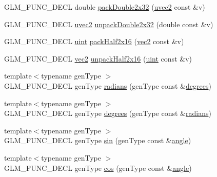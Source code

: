 \begin{DoxyCompactItemize}
\item 
G\+L\+M\+\_\+\+F\+U\+N\+C\+\_\+\+D\+E\+CL double \hyperlink{group__core__func__packing_gaf728fdfb98ce34da6f968d9f6bf154d7}{pack\+Double2x32} (\hyperlink{group__core__types_gafd2041b45eff671aa8899d2c2835eee9}{uvec2} const \&v)
\item 
G\+L\+M\+\_\+\+F\+U\+N\+C\+\_\+\+D\+E\+CL \hyperlink{group__core__types_gafd2041b45eff671aa8899d2c2835eee9}{uvec2} \hyperlink{group__core__func__packing_ga7e8cf88c278c18969c99af83bceed024}{unpack\+Double2x32} (double const \&v)
\item 
G\+L\+M\+\_\+\+F\+U\+N\+C\+\_\+\+D\+E\+CL \hyperlink{group__core__precision_ga4fd29415871152bfb5abd588334147c8}{uint} \hyperlink{group__core__func__packing_ga082f6dd65f73a547ed3067ef00be036f}{pack\+Half2x16} (\hyperlink{group__core__types_gaa1618f51db67eaa145db101d8c8431d8}{vec2} const \&v)
\item 
G\+L\+M\+\_\+\+F\+U\+N\+C\+\_\+\+D\+E\+CL \hyperlink{group__core__types_gaa1618f51db67eaa145db101d8c8431d8}{vec2} \hyperlink{group__core__func__packing_ga4051804cc2c930ba4ca73382b79edf1d}{unpack\+Half2x16} (\hyperlink{group__core__precision_ga4fd29415871152bfb5abd588334147c8}{uint} const \&v)
\item 
{\footnotesize template$<$typename gen\+Type $>$ }\\G\+L\+M\+\_\+\+F\+U\+N\+C\+\_\+\+D\+E\+CL gen\+Type \hyperlink{group__core__func__trigonometric_ga431d31cdb060059bc5b0696e212f1453}{radians} (gen\+Type const \&\hyperlink{group__core__func__trigonometric_gaf4e5661bd1c993f6090d49e988a4c78a}{degrees})
\item 
{\footnotesize template$<$typename gen\+Type $>$ }\\G\+L\+M\+\_\+\+F\+U\+N\+C\+\_\+\+D\+E\+CL gen\+Type \hyperlink{group__core__func__trigonometric_gaf4e5661bd1c993f6090d49e988a4c78a}{degrees} (gen\+Type const \&\hyperlink{group__core__func__trigonometric_ga431d31cdb060059bc5b0696e212f1453}{radians})
\item 
{\footnotesize template$<$typename gen\+Type $>$ }\\G\+L\+M\+\_\+\+F\+U\+N\+C\+\_\+\+D\+E\+CL gen\+Type \hyperlink{group__core__func__trigonometric_gafbab21016b7f3bc21afb09a7e42e2df1}{sin} (gen\+Type const \&\hyperlink{group__gtc__quaternion_ga23a3fc7ada5bbb665ff84c92c6e0542c}{angle})
\item 
{\footnotesize template$<$typename gen\+Type $>$ }\\G\+L\+M\+\_\+\+F\+U\+N\+C\+\_\+\+D\+E\+CL gen\+Type \hyperlink{group__core__func__trigonometric_gac6708d4f0895dc79b65f50db00840167}{cos} (gen\+Type const \&\hyperlink{group__gtc__quaternion_ga23a3fc7ada5bbb665ff84c92c6e0542c}{angle})

\end{DoxyCompactItemize}
